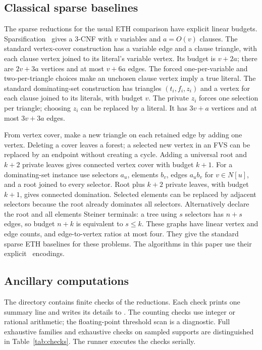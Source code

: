 \subsection{Classical sparse baselines}

The sparse reductions for the usual ETH comparison have explicit
linear budgets. Sparsification~\cite{IPZ01} gives a 3-CNF with $v$
variables and $a=O(v)$ clauses. The standard vertex-cover construction
has a variable edge and a clause triangle, with each clause vertex
joined to its literal's variable vertex. Its budget is $v+2a$;
there are $2v+3a$ vertices and at most $v+6a$ edges. The forced
one-per-variable and two-per-triangle choices make an unchosen clause
vertex imply a true literal. The standard dominating-set construction
has triangles $(t_i,f_i,z_i)$ and a vertex for each clause joined to
its literals, with budget $v$. The private $z_i$ forces one selection
per triangle; choosing $z_i$ can be replaced by a literal. It has
$3v+a$ vertices and at most $3v+3a$ edges.

From vertex cover, make a new triangle on each retained edge by adding
one vertex. Deleting a cover leaves a forest; a selected new vertex
in an FVS can be replaced by an endpoint without creating a cycle.
Adding a universal root and $k+2$ private leaves gives connected
vertex cover with budget $k+1$. For a dominating-set instance use
selectors $a_u$, elements $b_v$, edges $a_ub_v$ for $v\in N[u]$,
and a root joined to every selector. Root plus $k+2$ private leaves,
with budget $k+1$, gives connected domination. Selected elements can
be replaced by adjacent selectors because the root already dominates
all selectors. Alternatively declare the root and all elements Steiner
terminals: a tree using $s$ selectors has $n+s$ edges, so budget
$n+k$ is equivalent to $s\le k$. These graphs have linear vertex
and edge counts, and edge-to-vertex ratios at most four. They give
the standard sparse ETH baselines for these problems. The algorithms
in this paper use their explicit \HTC\ encodings.

\subsection{Ancillary computations}

The directory  contains finite checks of the reductions.
Each check prints one summary line and writes its details to
. The counting checks use
integer or rational arithmetic; the floating-point threshold scan is
a diagnostic. Full exhaustive families and exhaustive
checks on sampled supports are distinguished in Table~\ref{tab:checks}.
The runner executes the checks serially.

